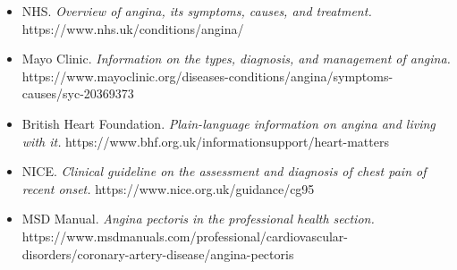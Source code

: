 \begin{itemize}
    \item NHS. \textit{Overview of angina, its symptoms, causes, and treatment.} https://www.nhs.uk/conditions/angina/
    \item Mayo Clinic. \textit{Information on the types, diagnosis, and management of angina.} https://www.mayoclinic.org/diseases-conditions/angina/symptoms-causes/syc-20369373
    \item British Heart Foundation. \textit{Plain-language information on angina and living with it.} https://www.bhf.org.uk/informationsupport/heart-matters
    \item NICE. \textit{Clinical guideline on the assessment and diagnosis of chest pain of recent onset.} https://www.nice.org.uk/guidance/cg95
    \item MSD Manual. \textit{Angina pectoris in the professional health section.} https://www.msdmanuals.com/professional/cardiovascular-disorders/coronary-artery-disease/angina-pectoris
\end{itemize}
